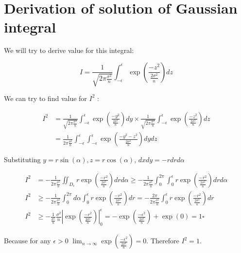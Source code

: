 \section{Derivation of solution of Gaussian integral}
\label{gaussian_integral_solution}

We will try to derive value for this integral:

\begin{equation}
I = \frac{1}{\sqrt{2\pi\frac{\sigma^2}{n}}}\int_{-\epsilon}^{\epsilon}\exp\left(\frac{-z^2}{\frac{2\sigma^2}{n}}\right)dz
\end{equation}

We can try to find value for $I^2$ :

\begin{equation}
\begin{aligned}
I^2 & = \frac{1}{\sqrt{2\pi\frac{\sigma^2}{n}}}\int_{-\epsilon}^{\epsilon}\exp\left(\frac{-y^2}{\frac{2\sigma^2}{n}}\right)dy
			  \times \frac{1}{\sqrt{2\pi\frac{\sigma^2}{n}}}\int_{-\epsilon}^{\epsilon}\exp\left(\frac{-z^2}{\frac{2\sigma^2}{n}}\right)dz \\			
		& = \frac{1}{2\pi\frac{\sigma^2}{n}}\int_{-\epsilon}^{\epsilon}\int_{-\epsilon}^{\epsilon}\exp\left(\frac{-y^2-z^2}{\frac{2\sigma^2}{n}}\right)dydz			
\end{aligned}
\end{equation}


Substituting $y=r\sin(\alpha), z=r\cos(\alpha)$, $dxdy = -rdrd\alpha$

\begin{equation}
\begin{aligned}
I^2 & = -\frac{1}{2\pi\frac{\sigma^2}{n}}\iint_{D_{\epsilon}}r\exp\left(\frac{-r^2}{\frac{2\sigma^2}{n}}\right)drd\alpha 
			\geq -\frac{1}{2\pi\frac{\sigma^2}{n}}\int_0^{2\pi}\int_{0}^{\epsilon} r\exp\left(\frac{-r^2}{\frac{2\sigma^2}{n}}\right)drd\alpha	\\
I^2	&	\geq -\frac{1}{2\pi\frac{\sigma^2}{n}}\int_0^{2\pi}d\alpha\int_{0}^{\epsilon} r\exp\left(\frac{-r^2}{\frac{2\sigma^2}{n}}\right)dr	
			= -\frac{2\pi}{2\pi\frac{\sigma^2}{n}}\int_{0}^{\epsilon} r\exp\left(\frac{-r^2}{\frac{2\sigma^2}{n}}\right)dr \\
I^2	&	\geq -\frac{1}{\frac{\sigma^2}{n}}\frac{\sigma^2}{n}\left| \exp\left(\frac{-r^2}{\frac{2\sigma^2}{n}}\right)\right|_0^{\epsilon} 
			= -\exp\left(\frac{-\epsilon^2}{\frac{2\sigma^2}{n}}\right) + \exp(0)	= 1\square		
\end{aligned}
\end{equation}

Because for any $\epsilon > 0$ $\lim_{n \to \infty}\exp\left(\frac{-\epsilon^2}{\frac{2\sigma^2}{n}}\right) = 0$. Therefore $I^2 =  1$.
